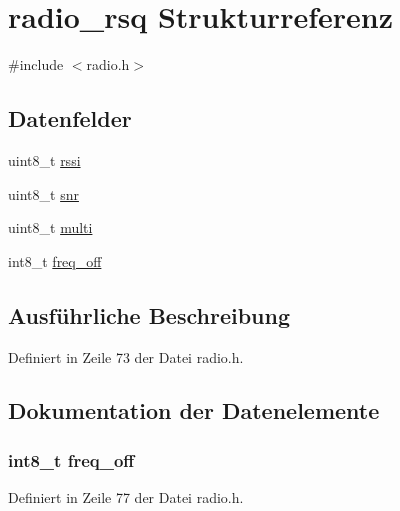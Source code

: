 \hypertarget{structradio__rsq}{}\section{radio\+\_\+rsq Strukturreferenz}
\label{structradio__rsq}


{\ttfamily \#include $<$radio.\+h$>$}

\subsection*{Datenfelder}
\begin{DoxyCompactItemize}
\item 
uint8\+\_\+t \hyperlink{structradio__rsq_afb67d818cd76cce8057affabcb1979a6}{rssi}
\item 
uint8\+\_\+t \hyperlink{structradio__rsq_a11be3c6f2d5194542e5d1733cbc7ac76}{snr}
\item 
uint8\+\_\+t \hyperlink{structradio__rsq_af829dbd700d1c5ad1abccbdb52fa7ba9}{multi}
\item 
int8\+\_\+t \hyperlink{structradio__rsq_a168a73926de154445f6c6c77f8b5e53c}{freq\+\_\+off}
\end{DoxyCompactItemize}


\subsection{Ausführliche Beschreibung}


Definiert in Zeile 73 der Datei radio.\+h.



\subsection{Dokumentation der Datenelemente}
\hypertarget{structradio__rsq_a168a73926de154445f6c6c77f8b5e53c}{}
\subsubsection[{freq\+\_\+off}]{\setlength{\rightskip}{0pt plus 5cm}int8\+\_\+t freq\+\_\+off}\label{structradio__rsq_a168a73926de154445f6c6c77f8b5e53c}


Definiert in Zeile 77 der Datei radio.\+h.

\hypertarget{structradio__rsq_af829dbd700d1c5ad1abccbdb52fa7ba9}{}
